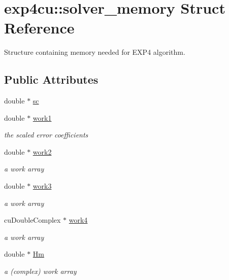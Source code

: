 \hypertarget{structexp4cu_1_1solver__memory}{}\section{exp4cu\+:\+:solver\+\_\+memory Struct Reference}
\label{structexp4cu_1_1solver__memory}


Structure containing memory needed for E\+X\+P4 algorithm.  


\subsection*{Public Attributes}
\begin{DoxyCompactItemize}
\item 
double $\ast$ \hyperlink{structexp4cu_1_1solver__memory_afb9f6a3602a177e7283a45afade87695}{sc}
\item 
double $\ast$ \hyperlink{structexp4cu_1_1solver__memory_aecfb53728ed87d6857212dd1e19345a8}{work1}
\begin{DoxyCompactList}\small\item\em the scaled error coefficients \end{DoxyCompactList}\item 
double $\ast$ \hyperlink{structexp4cu_1_1solver__memory_a571d5da694382eb078504242f69c4b78}{work2}
\begin{DoxyCompactList}\small\item\em a work array \end{DoxyCompactList}\item 
double $\ast$ \hyperlink{structexp4cu_1_1solver__memory_a1798b2513a1d21e9beaa998f1dc1df89}{work3}
\begin{DoxyCompactList}\small\item\em a work array \end{DoxyCompactList}\item 
cu\+Double\+Complex $\ast$ \hyperlink{structexp4cu_1_1solver__memory_a8b2943ea29259b541a9143409bc8317d}{work4}
\begin{DoxyCompactList}\small\item\em a work array \end{DoxyCompactList}\item 
double $\ast$ \hyperlink{structexp4cu_1_1solver__memory_aed9282a748435b4cc9e230bd92b9b91f}{Hm}
\begin{DoxyCompactList}\small\item\em a (complex) work array \end{DoxyCompactList}\item 

\end{DoxyCompactItemize}
